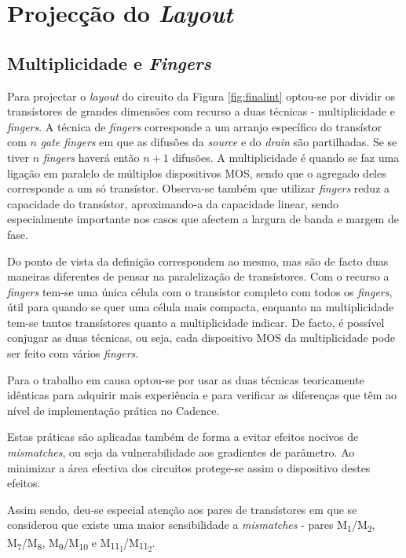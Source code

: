 \documentclass[11pt]{article}
\numberwithin{equation}{section}
\begin{document}
\section{Projecção do \textit{Layout}}

\subsection{Multiplicidade e \textit{Fingers}}

Para projectar o \textit{layout} do circuito da Figura \ref{fig:finalint} optou-se por dividir os transístores de grandes dimensões com recurso a duas técnicas - multiplicidade e \textit{fingers}. A técnica de \textit{fingers} corresponde a um arranjo específico do transístor com $n$ \textit{gate fingers} em que as difusões da \textit{source} e do \textit{drain} são partilhadas. Se se tiver $n$ \textit{fingers} haverá então $n+1$ difusões. A multiplicidade é quando se faz uma ligação em paralelo de múltiplos dispositivos MOS, sendo que o agregado deles corresponde a um só transístor. Observa-se também que utilizar \textit{fingers} reduz a capacidade do transístor, aproximando-a da capacidade linear, sendo especialmente importante nos casos que afectem a largura de banda e margem de fase. 

Do ponto de vista da definição correspondem ao mesmo, mas são de facto duas maneiras diferentes de pensar na paralelização de transístores. Com o recurso a \textit{fingers} tem-se uma única célula com o transístor completo com todos os \textit{fingers}, útil para quando se quer uma célula mais compacta, enquanto na multiplicidade tem-se tantos transístores quanto a multiplicidade indicar. De facto, é possível conjugar as duas técnicas, ou seja, cada dispositivo MOS da multiplicidade pode ser feito com vários \textit{fingers}.

Para o trabalho em causa optou-se por usar as duas técnicas teoricamente idênticas para adquirir mais experiência e para verificar as diferenças que têm ao nível de implementação prática no Cadence.

Estas práticas são aplicadas também de forma a evitar  efeitos nocivos de \textit{mismatches}, ou seja da vulnerabilidade aos gradientes de parâmetro. Ao minimizar a área efectiva dos circuitos protege-se assim o dispositivo destes efeitos.

Assim sendo, deu-se especial atenção aos pares de transístores em que se considerou que existe uma maior sensibilidade a \textit{mismatches} - pares M\textsubscript{1}/M\textsubscript{2}, M\textsubscript{7}/M\textsubscript{8}, M\textsubscript{9}/M\textsubscript{10} e M\textsubscript{11\textsubscript{1}}/M\textsubscript{11\textsubscript{2}}. 
\end{document}
